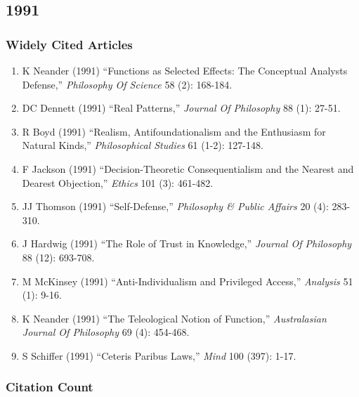\documentclass[
  10pt,
  letterpaper,
  DIV=11,
  numbers=noendperiod,
  twoside]{scrartcl}
\providecommand{\tightlist}{%
  \setlength{\itemsep}{0pt}\setlength{\parskip}{0pt}}\usepackage{longtable,booktabs,array}
\begin{document}
\newpage

\subsection{1991}\label{sec-s1991}

\subsubsection*{Widely Cited Articles}\label{widely-cited-articles-35}

\begin{enumerate}
\def\labelenumi{\arabic{enumi}.}
\tightlist
\item
  K Neander (1991) ``Functions as Selected Effects: The Conceptual
  Analysts Defense,'' \emph{Philosophy Of Science} 58 (2): 168-184.
\item
  DC Dennett (1991) ``Real Patterns,'' \emph{Journal Of Philosophy} 88
  (1): 27-51.
\item
  R Boyd (1991) ``Realism, Antifoundationalism and the Enthusiasm for
  Natural Kinds,'' \emph{Philosophical Studies} 61 (1-2): 127-148.
\item
  F Jackson (1991) ``Decision-Theoretic Consequentialism and the Nearest
  and Dearest Objection,'' \emph{Ethics} 101 (3): 461-482.
\item
  JJ Thomson (1991) ``Self-Defense,'' \emph{Philosophy \& Public
  Affairs} 20 (4): 283-310.
\item
  J Hardwig (1991) ``The Role of Trust in Knowledge,'' \emph{Journal Of
  Philosophy} 88 (12): 693-708.
\item
  M McKinsey (1991) ``Anti-Individualism and Privileged Access,''
  \emph{Analysis} 51 (1): 9-16.
\item
  K Neander (1991) ``The Teleological Notion of Function,''
  \emph{Australasian Journal Of Philosophy} 69 (4): 454-468.
\item
  S Schiffer (1991) ``Ceteris Paribus Laws,'' \emph{Mind} 100 (397):
  1-17.
\end{enumerate}

\subsubsection*{Citation Count}\label{sec-count-1991}
\end{document}

